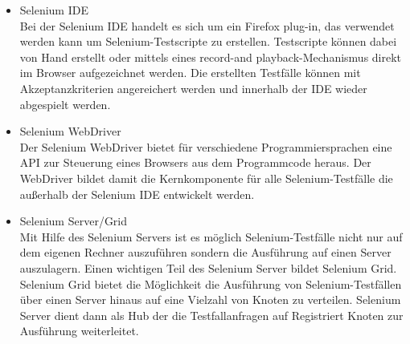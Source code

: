 \begin{itemize}
\item Selenium IDE \\
Bei der Selenium IDE handelt es sich um ein Firefox plug-in, das verwendet werden kann um Selenium-Testscripte zu erstellen. Testscripte können dabei von Hand erstellt oder mittels eines \grq record-and playback\grq -Mechanismus direkt im Browser aufgezeichnet werden. Die erstellten Testfälle können mit Akzeptanzkriterien angereichert werden und innerhalb der IDE wieder abgespielt werden.
\item Selenium WebDriver \\
Der Selenium WebDriver bietet für verschiedene Programmiersprachen eine API zur Steuerung eines Browsers aus dem Programmcode heraus. Der WebDriver bildet damit die Kernkomponente für alle Selenium-Testfälle die außerhalb der Selenium IDE entwickelt werden.

\item Selenium Server/Grid \\
Mit Hilfe des Selenium Servers ist es möglich Selenium-Testfälle nicht nur auf dem eigenen Rechner auszuführen sondern die Ausführung auf einen Server auszulagern. Einen wichtigen Teil des Selenium Server bildet Selenium Grid. Selenium Grid bietet die Möglichkeit die Ausführung von Selenium-Testfällen über einen Server hinaus auf eine Vielzahl von Knoten zu verteilen. Selenium Server dient dann als Hub der die Testfallanfragen auf Registriert Knoten zur Ausführung weiterleitet. 
\end{itemize}


